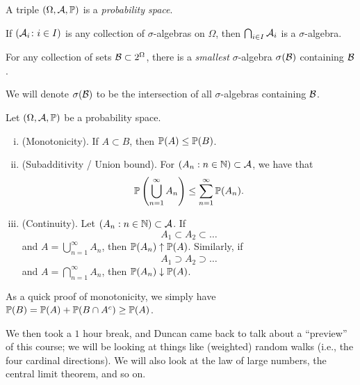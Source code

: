 A triple $(\Omega, \mathcal A, \mathbb P)$ is a \textit{probability space}.

\begin{exercise}
    If $(\mathcal A_i \colon i \in I)$ is any collection of $\sigma$-algebras on $\Omega$, then $\bigcap_{i \in I} \mathcal A_i$ is a $\sigma$-algebra.
\end{exercise}
\begin{exercise}
    For any collection of sets $\mathcal B \subset 2^\Omega$, there is a \textit{smallest} $\sigma$-algebra $\sigma(\mathcal B)$ containing $\mathcal B$. 
\end{exercise}

We will denote $\sigma(\mathcal B)$ to be the intersection of all $\sigma$-algebras containing $\mathcal B$.
\begin{fact} \label{fact:probability_space_properties}
    Let $(\Omega, \mathcal A, \mathbb P)$ be a probability space.
    \begin{enumerate}[(i)]
        \item (Monotonicity). If $A \subset B$, then $\mathbb P(A) \leq \mathbb P(B)$.
        \item (Subadditivity / Union bound). For $(A_n : n \in \mathbb N) \subset \mathcal A$, we have that
        \[ \mathbb P\left(\bigcup_{n=1}^\infty A_n\right) \leq \sum_{n=1}^\infty \mathbb P(A_n). \]
        \item (Continuity). Let $(A_n : n \in \mathbb N) \subset \mathcal A$. If
        \[ A_1 \subset A_2 \subset \dots \]
        and $A = \bigcup_{n=1}^\infty A_n$, then $\mathbb P(A_n) \uparrow \mathbb P(A)$. Similarly, if
        \[ A_1 \supset A_2 \supset \dots \]
        and $A = \bigcap_{n=1}^\infty A_n$, then $\mathbb P(A_n) \downarrow \mathbb P(A)$.
    \end{enumerate}
\end{fact}
As a quick proof of monotonicity, we simply have $\mathbb P(B) = \mathbb P(A) + \mathbb P(B \cap A^c) \geq \mathbb P(A)$.

\newpage
We then took a $1$ hour break, and Duncan came back to talk about a ``preview'' of this course; we will be looking at things like (weighted) random walks (i.e., the four cardinal directions). We will also look at the law of large numbers, the central limit theorem, and so on. %

